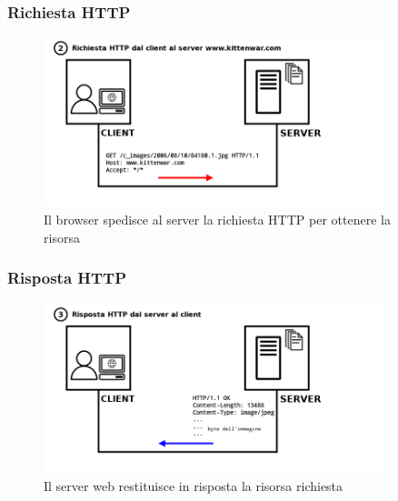 \documentclass{beamer}
\begin{document}
\subsubsection*{Richiesta HTTP}
\begin{frame}{\insertsubsection}{\insertsubsubsection}
\begin{figure}
\includegraphics[width=0.88\textwidth]{imgs/http-kittenwar-2.png}
\caption{Il browser spedisce al server la richiesta HTTP per ottenere la
risorsa}
\end{figure}
\end{frame}

\subsubsection*{Risposta HTTP}
\begin{frame}{\insertsubsection}{\insertsubsubsection}
\begin{figure}
\includegraphics[width=0.88\textwidth]{imgs/http-kittenwar-3.png}
\caption{Il server web restituisce in risposta la risorsa richiesta}
\end{figure}
\end{frame}
\end{document}
